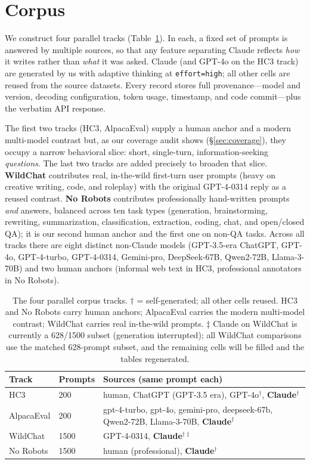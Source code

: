 \documentclass[11pt]{article}
\begin{document}
\section{Corpus}
We construct four parallel tracks (Table~\ref{tab:corpus}). In each, a fixed set
of prompts is answered by multiple sources, so that any feature separating Claude
reflects \emph{how} it writes rather than \emph{what} it was asked. Claude
(and GPT-4o on the HC3 track) are generated by us with adaptive thinking at
\texttt{effort=high}; all other cells are reused from the source datasets. Every
record stores full provenance---model and version, decoding configuration,
token usage, timestamp, and code commit---plus the verbatim API response.

The first two tracks (HC3, AlpacaEval) supply a human anchor and a modern
multi-model contrast but, as our coverage audit shows (\S\ref{sec:coverage}), they
occupy a narrow behavioral slice: short, single-turn, information-seeking
\emph{questions}. The last two tracks are added precisely to broaden that slice.
\textbf{WildChat} contributes real, in-the-wild first-turn user prompts (heavy on
creative writing, code, and roleplay) with the original GPT-4-0314 reply as a
reused contrast. \textbf{No Robots} contributes professionally hand-written
prompts \emph{and} answers, balanced across ten task types (generation,
brainstorming, rewriting, summarization, classification, extraction, coding,
chat, and open/closed QA); it is our second human anchor and the first one on
non-QA tasks. Across all tracks there are eight distinct non-Claude models
(GPT-3.5-era ChatGPT, GPT-4o, GPT-4-turbo, GPT-4-0314, Gemini-pro, DeepSeek-67B,
Qwen2-72B, Llama-3-70B) and two human anchors (informal web text in HC3,
professional annotators in No Robots).

\begin{table}[t]
\centering\small
\setlength{\tabcolsep}{4pt}
\begin{tabular}{@{}ll p{4.3cm}@{}}
\toprule
Track & Prompts & Sources (same prompt each) \\
\midrule
HC3 & 200 & human, ChatGPT (GPT-3.5 era),
  GPT-4o$^\dagger$, \textbf{Claude}$^\dagger$ \\[3pt]
AlpacaEval & 200 & gpt-4-turbo, gpt-4o, gemini-pro,
  deepseek-67b, Qwen2-72B, Llama-3-70B, \textbf{Claude}$^\dagger$ \\[3pt]
WildChat & 1500 & GPT-4-0314, \textbf{Claude}$^{\dagger\ddagger}$ \\[3pt]
No Robots & 1500 & human (professional), \textbf{Claude}$^\dagger$ \\
\bottomrule
\end{tabular}
\caption{The four parallel corpus tracks. $\dagger$ = self-generated; all other
cells reused. HC3 and No Robots carry human anchors; AlpacaEval carries the
modern multi-model contrast; WildChat carries real in-the-wild prompts.
$\ddagger$ Claude on WildChat is currently a 628/1500 subset (generation
interrupted); all WildChat comparisons use the matched 628-prompt subset, and
the remaining cells will be filled and the tables regenerated.}
\label{tab:corpus}
\end{table}
\end{document}

